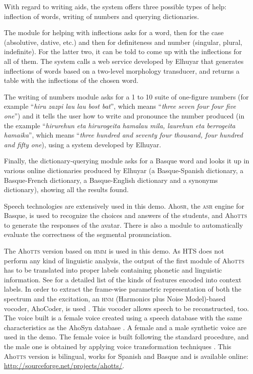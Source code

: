 \documentclass[output=paper]{LSP/langsci}
\begin{document}
With regard to writing aids, the system offers three possible types of help: inflection of words, writing of numbers and querying dictionaries.

The module for helping with inflections asks for a word, then for the case (absolutive, dative, etc.) and then for definiteness and number (singular, plural, indefinite). For the latter two, it can be told to come up with the inflections for all of them. The system calls a web service developed by Elhuyar that generates inflections of words based on a two-level morphology transducer, and returns a table with the inflections of the chosen word.

\newpage 
The writing of numbers module asks for a 1 to 10 suite of one-figure numbers (for example ``\textit{hiru zazpi lau lau bost bat}'', which means ``\textit{three seven four four five one}'') and it tells the user how to write and pronounce the number produced (in the example ``\textit{hirurehun eta hirurogeita hamalau mila, laurehun eta berrogeita hamaika}'', which means ``\textit{three hundred and seventy four thousand, four hundred and fifty one}), using a system developed by Elhuyar.

Finally, the dictionary-querying module asks for a Basque word and looks it up in various online dictionaries produced by Elhuyar (a Basque-Spanish dictionary, a Basque-French dictionary, a Basque-English dictionary and a synonyms dictionary), showing all the results found.

Speech technologies are extensively used in this demo. Aho\textsc{sr}, the \textsc{asr} engine for Basque, is used to recognize the choices and answers of the students, and Aho\textsc{tts} to generate the responses of the avatar. There is also a module to automatically evaluate the correctness of the segmental pronunciation.

The Aho\textsc{tts} version based on \textsc{hmm} is used in this demo. As HTS does not perform any kind of linguistic analysis, the output of the first module of Aho\textsc{tts} has to be translated into proper labels containing phonetic and linguistic information. See \citet{ErroEtAl2010} for a detailed list of the kinds of features encoded into context labels. In order to extract the frame-wise parametric representation of both the spectrum and the excitation, an \textsc{hnm} (Harmonics plus Noise Model)-based vocoder, AhoCoder, is used \citep{ErroEtAl2011b}. This vocoder allows speech to be reconstructed, too. The voice built is a female voice created using a speech database with the same characteristics as the AhoSyn database \citep{SainzEtAl2012}. A female and a male synthetic voice are used in the demo. The female voice is built following the standard procedure, and the male one is obtained by applying voice transformation techniques \citep{ErroEtAl2013}. This Aho\textsc{tts} version is bilingual, works for Spanish and Basque and is available online: \url{http://sourceforge.net/projects/ahotts/}.
\end{document}
